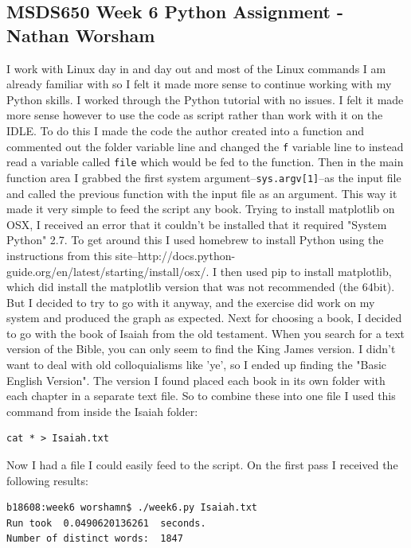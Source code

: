 \documentclass[10pt]{article}
\begin{document}
\subsection*{MSDS650 Week 6 Python  Assignment - Nathan Worsham}
I work with Linux day in and day out and most of the Linux commands I am already familiar with so I felt it made more sense to continue working with my Python skills. I worked through the Python tutorial with no issues. I felt it made more sense however to use the code as script rather than work with it on the IDLE. To do this I made the code the author created into a function and commented out the folder variable line and changed the \verb|f| variable line to instead read a variable called \verb|file| which would be fed to the function. Then in the main function area I grabbed the first system argument--\verb|sys.argv[1]|--as the input file and called the previous function with the input file as an argument. This way it made it very simple to feed the script any book.
Trying to install matplotlib on OSX, I received an error that it couldn't be installed that it required "System Python" 2.7. To get around this I used homebrew to install Python using the instructions from this site--http://docs.python-guide.org/en/latest/starting/install/osx/. I then used pip to install matplotlib, which did install the matplotlib version that was not recommended (the 64bit). But I decided to try to go with it anyway, and the exercise did work on my system and produced the graph as expected. 
Next for choosing a book, I decided to go with the book of Isaiah from the old testament. When you search for a text version of the Bible, you can only seem to find the King James version. I didn't want to deal with old colloquialisms like 'ye', so I ended up finding the "Basic English Version". The version I found placed each book in its own folder with each chapter in a separate text file. So to combine these into one file I used this command from inside the Isaiah folder:
\begin{verbatim}
cat * > Isaiah.txt
\end{verbatim}
Now I had a file I could easily feed to the script. On the first pass I received the following results:
\begin{Verbatim}[fontsize=\small]
b18608:week6 worshamn$ ./week6.py Isaiah.txt 
Run took  0.0490620136261  seconds.
Number of distinct words:  1847
\end{Verbatim}
\end{document}
